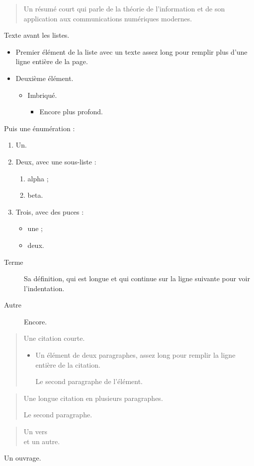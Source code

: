 \documentclass{article}
\begin{document}
\begin{abstract}
Un résumé court qui parle de la théorie de l'information et de son application aux communications numériques modernes.
\end{abstract}
Texte avant les listes.
\begin{itemize}
\item Premier élément de la liste avec un texte assez long pour remplir plus d'une ligne entière de la page.
\item Deuxième élément.
\begin{itemize}
\item Imbriqué.
\begin{itemize}
\item Encore plus profond.
\end{itemize}
\end{itemize}
\end{itemize}
Puis une énumération :
\begin{enumerate}
\item Un.
\item Deux, avec une sous-liste :
\begin{enumerate}
\item alpha ;
\item beta.
\end{enumerate}
\item Trois, avec des puces :
\begin{itemize}
\item une ;
\item deux.
\end{itemize}
\end{enumerate}

\begin{description}
\item[Terme] Sa définition, qui est longue et qui continue sur la ligne suivante pour voir l'indentation.
\item[Autre] Encore.
\end{description}
\begin{quote}
Une citation courte.
\begin{itemize}
\item Un élément de deux paragraphes, assez long pour remplir la ligne entière de la citation.

Le second paragraphe de l'élément.
\end{itemize}
\end{quote}
\begin{quotation}
Une longue citation en plusieurs paragraphes.

Le second paragraphe.
\end{quotation}
\begin{verse}
Un vers\\
et un autre.
\end{verse}
\begin{thebibliography}{9}
 Un ouvrage.
\end{thebibliography}
\end{document}
